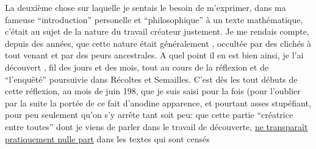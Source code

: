 La deuxième chose sur laquelle je sentais le besoin de m'exprimer, dans ma fameuse ``introduction''  personelle et ``philosophique'' à un texte mathématique, c'était au sujet de la nature du travail créateur justement. Je me rendais compte, depuis des années, que cette nature était généralement , occultée par des clichés à tout venant et par des  peurs ancestrales. A quel point il en est bien ainsi, je l'ai découvert  ,  fil des jours et des mois, tout au cours de la réflexion et de ``l'enquêté'' poursuivie dans Récoltes et Semailles. C'est dès les tout débuts de cette réflexion, au mois de juin 198, que je suis saisi pour la  fois (pour l'oublier  par la suite\handwritten{,}  la portée de ce fait d'anodine apparence, et pourtant asses stupéfiant, pour peu seulement qu'on s'y arrête tant soit peu: que cette partie ``créatrice entre toutes'' dont je viens de parler dans le travail de découverte, \uline{ne transparaît pratiquement nulle part} dans les textes  qui sont censés
